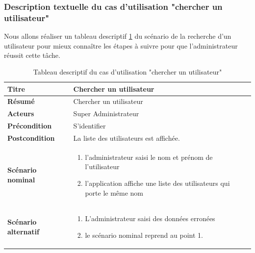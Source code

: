 \documentclass{article}
\begin{document}
\subsubsection{Description textuelle du cas d'utilisation "chercher un utilisateur"}
Nous allons réaliser un tableau descriptif \ref{tab:tab6} du scénario de la recherche d'un utilisateur
pour mieux connaître les étapes à suivre pour que l'administrateur réussit cette
tâche.
\begin{table}[H]
\centering
 \begin{tabularx}{\textwidth}{|X||X|}
\hline
 \textbf{Titre} & \textbf{Chercher un utilisateur} \\ \hline
\textbf{Résumé} & Chercher un utilisateur \\
\hline
\textbf{Acteurs} &Super Administrateur\\
\hline
\textbf{Précondition} & S'identifier \\
\hline
\textbf{Postcondition} & La liste des utilisateurs est affichée. \\
\hline
\textbf{Scénario nominal} & \begin{enumerate}
\item l'administrateur saisi le nom et prénom de l'utilisateur
\item l'application affiche une liste des utilisateurs qui porte
le même nom
\end{enumerate} \\
\hline
\textbf{Scénario alternatif} & \begin{enumerate}
\item L'administrateur saisi des données erronées
\item le scénario nominal reprend au point 1.
\end{enumerate} \\
\hline
\end{tabularx}
\caption[tableau 6 : Tableau descriptif du cas d'utilisation "chercher un utilisateur"]{Tableau descriptif du cas d'utilisation "chercher un utilisateur"}
\label{tab:tab6}
\end{table}
\end{document}
